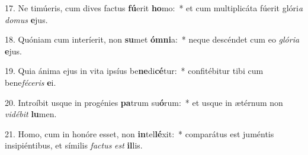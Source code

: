 17. Ne timúeris, cum dives factus \textbf{fú}erit \textbf{ho}mo:~*  et cum multiplicáta fúerit glóri\textit{a} \textit{do}\textit{mus} \textbf{e}jus.\

18. Quóniam cum interíerit, non \textbf{su}met \textbf{óm}\textbf{ni}a:~*  neque descéndet cum eo \textit{gló}\textit{ri}\textit{a} \textbf{e}jus.\

19. Quia ánima ejus in vita ipsíus be\textbf{ne}di\textbf{cé}tur:~*  confitébitur tibi cum bene\textit{fé}\textit{ce}\textit{ris} \textbf{e}i.\

20. Introíbit usque in progénies \textbf{pa}trum su\textbf{ó}rum:~*  et usque in ætérnum non \textit{vi}\textit{dé}\textit{bit} \textbf{lu}men.\

21. Homo, cum in honóre esset, non \textbf{in}tel\textbf{lé}xit:~*  comparátus est juméntis insipiéntibus, et símilis \textit{fac}\textit{tus} \textit{est} \textbf{il}lis.\

